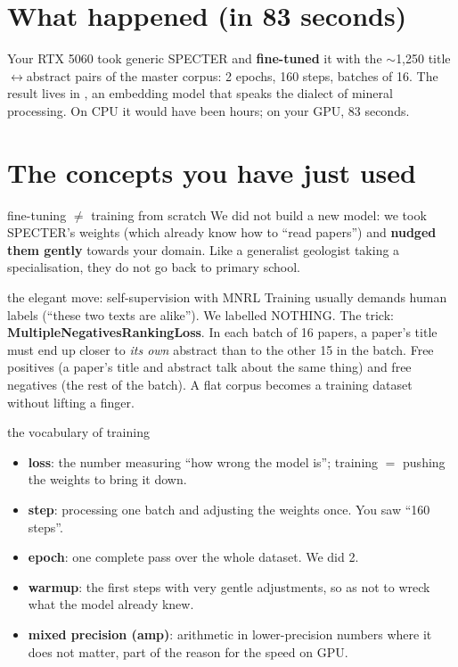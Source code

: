 \documentclass[11pt,a4paper]{article}
\begin{document}

\section{What happened (in 83 seconds)}

Your RTX 5060 took generic SPECTER and \textbf{fine-tuned} it with the $\sim$1,250
title$\leftrightarrow$abstract pairs of the master corpus: 2 epochs, 160 steps, batches of 16.
The result lives in , an embedding model that speaks the dialect
of mineral processing. On CPU it would have been hours; on your GPU, 83 seconds.

\section{The concepts you have just used}

\begin{concepto}{fine-tuning $\neq$ training from scratch}
We did not build a new model: we took SPECTER's weights (which already know how to ``read
papers'') and \textbf{nudged them gently} towards your domain. Like a generalist geologist
taking a specialisation, they do not go back to primary school.
\end{concepto}

\begin{concepto}{the elegant move: self-supervision with MNRL}
Training usually demands human labels (``these two texts are alike''). We labelled NOTHING. The
trick: \textbf{MultipleNegativesRankingLoss}. In each batch of 16 papers, a paper's title must
end up closer to \emph{its own} abstract than to the other 15 in the batch. Free positives (a
paper's title and abstract talk about the same thing) and free negatives (the rest of the
batch). A flat corpus becomes a training dataset without lifting a finger.
\end{concepto}

\begin{concepto}{the vocabulary of training}
\begin{itemize}
  \item \textbf{loss}: the number measuring ``how wrong the model is''; training $=$ pushing the
        weights to bring it down.
  \item \textbf{step}: processing one batch and adjusting the weights once. You saw ``160 steps''.
  \item \textbf{epoch}: one complete pass over the whole dataset. We did 2.
  \item \textbf{warmup}: the first steps with very gentle adjustments, so as not to wreck what
        the model already knew.
  \item \textbf{mixed precision (amp)}: arithmetic in lower-precision numbers where it does not
        matter, part of the reason for the speed on GPU.
\end{itemize}
\end{concepto}
\end{document}
